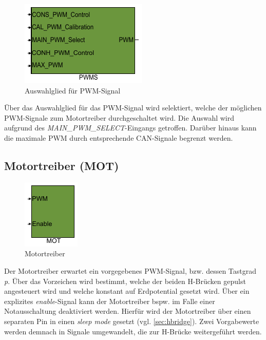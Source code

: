 \begin{figure}[H]%
\centering
\includegraphics[width=0.25\columnwidth]{./Bilder/fig_pwm}%
\caption{Auswahlglied für PWM-Signal}%
\label{fig_pwm}%
\end{figure}

Über das Auswahlglied für das PWM-Signal wird selektiert, welche der möglichen PWM-Signale zum Motortreiber durchgeschaltet wird. Die Auswahl wird aufgrund des \textit{MAIN\_PWM\_SELECT}-Eingangs getroffen. Darüber hinaus kann die maximale PWM durch entsprechende CAN-Signale begrenzt werden. 

\subsection{Motortreiber (MOT)} \label{subsec:MOT}

\begin{figure}[H]%
\centering
\includegraphics[width=0.10\columnwidth]{./Bilder/fig_mot}%
\caption{Motortreiber}%
\label{fig_mot}%
\end{figure}

Der Motortreiber erwartet ein vorgegebenes PWM-Signal, bzw. dessen Tastgrad \textit{p}. Über das Vorzeichen wird bestimmt, welche der beiden H-Brücken gepulst angesteuert wird und welche konstant auf Erdpotential gesetzt wird. Über ein explizites \textit{enable}-Signal kann der Motortreiber bspw. im Falle einer Notausschaltung deaktiviert werden. Hierfür wird der Motortreiber über einen separaten Pin in einen \textit{sleep mode} gesetzt (vgl. \autoref{sec:hbridge}). Zwei Vorgabewerte werden demnach in Signale umgewandelt, die zur H-Brücke weitergeführt werden.


